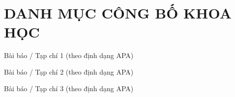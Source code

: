 \chapter*{DANH MỤC CÔNG BỐ KHOA HỌC}
\vspace*{2ex}
\begin{publication}

\item Bài báo / Tạp chí 1 (theo định dạng APA)
\item Bài báo / Tạp chí 2 (theo định dạng APA)
\item Bài báo / Tạp chí 3 (theo định dạng APA)

\end{publication}
